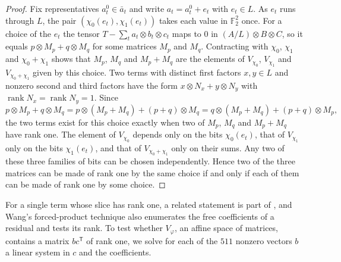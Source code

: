 \documentclass[11pt]{amsart}
\theoremstyle{definition}
\theoremstyle{remark}
\numberwithin{equation}{section}
\newcommand{\F}{\mathbb{F}_2}
\newcommand{\rk}{\operatorname{rank}}
\begin{document}
\begin{proof}
Fix representatives $a_t^0\in\bar a_t$ and write $a_t=a_t^0+e_t$ with $e_t\in L$. As $e_t$ runs through $L$, the pair $(\chi_0(e_t),\chi_1(e_t))$ takes each value in $\F^2$ once. For a choice of the $e_t$ the tensor $T-\sum_ta_t\otimes b_t\otimes c_t$ maps to $0$ in $(A/L)\otimes B\otimes C$, so it equals $p\otimes M_p+q\otimes M_q$ for some matrices $M_p$ and $M_q$. Contracting with $\chi_0$, $\chi_1$ and $\chi_0+\chi_1$ shows that $M_p$, $M_q$ and $M_p+M_q$ are the elements of $V_{\chi_0}$, $V_{\chi_1}$ and $V_{\chi_0+\chi_1}$ given by this choice. Two terms with distinct first factors $x,y\in L$ and nonzero second and third factors have the form $x\otimes N_x+y\otimes N_y$ with $\rk N_x=\rk N_y=1$. Since
\[
p\otimes M_p+q\otimes M_q=p\otimes(M_p+M_q)+(p+q)\otimes M_q=q\otimes(M_p+M_q)+(p+q)\otimes M_p ,
\]
the two terms exist for this choice exactly when two of $M_p$, $M_q$ and $M_p+M_q$ have rank one. The element of $V_{\chi_0}$ depends only on the bits $\chi_0(e_t)$, that of $V_{\chi_1}$ only on the bits $\chi_1(e_t)$, and that of $V_{\chi_0+\chi_1}$ only on their sums. Any two of these three families of bits can be chosen independently. Hence two of the three matrices can be made of rank one by the same choice if and only if each of them can be made of rank one by some choice.
\end{proof}

For a single term whose slice has rank one, a related statement is part of \cite[Proposition~3.1]{LM17}, and Wang's forced-product technique \cite{Wan26a} also enumerates the free coefficients of a residual and tests its rank. To test whether $V_\varphi$, an affine space of matrices, contains a matrix $bc^{\mathsf T}$ of rank one, we solve for each of the $511$ nonzero vectors $b$ a linear system in $c$ and the coefficients.
\end{document}
